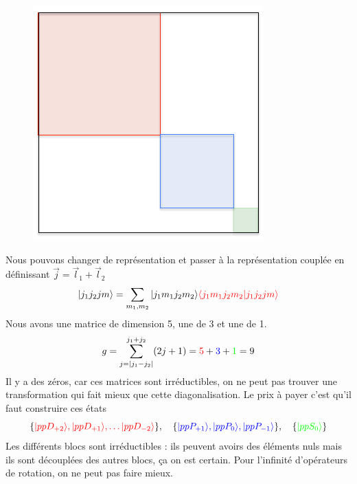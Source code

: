 	\begin{figure}
	\vspace{-5mm}
	\includegraphics[scale=0.4]{ch1/image3}
	\end{figure}
Nous pouvons changer de représentation et passer à la représentation couplée en 
définissant $\vec{j} = \vec l_1+\vec l_2$
\begin{equation}
\vert j_1 j_2 j m \rangle = 
\sum_{m_1,m_2} \vert j_1 m_1 j_2 m_2 \rangle 
{\color{red} 
\langle  j_1 m_1 j_2 m_2  \vert j_1 j_2 j m \rangle 
}
\end{equation}
Nous avons une matrice de dimension 5, une de 3 et une de 1. 
\begin{equation}
g = \sum_{j=\vert j_1 - j_2 \vert}^{ j_1 + j_2}
(2j+1)=
{\color{red}  5}  
+ {\color{blue}  3}  
+ {\color{green}  1} = 9
\end{equation}
Il y a des zéros, car ces matrices
sont irréductibles, on ne peut pas trouver une transformation qui fait mieux que cette 
diagonalisation. Le prix à payer c'est qu'il faut construire ces états
\begin{equation}
\{
{\color{red} 
\vert ppD_{+2} \rangle ,
\vert ppD_{+1}  \rangle , 
\ldots
\vert ppD_{-2}  \rangle } \},\quad
\{
{\color{blue} 
\vert ppP_{+1} \rangle ,
\vert ppP_{0}  \rangle , 
\vert ppP_{-1}  \rangle }  \},\quad
\{
{\color{green} 
\vert ppS_{0}  \rangle }
 \}
\end{equation}
Les différents blocs sont irréductibles : ils peuvent avoirs des éléments nuls mais ils sont
découplées des autres blocs, ça on est certain. Pour l'infinité d'opérateurs de rotation, on
ne peut pas faire mieux.




